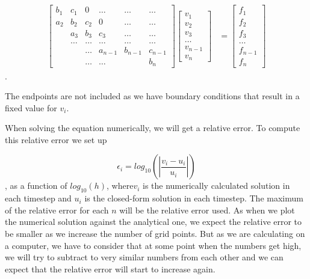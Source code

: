 \documentclass[a4paper,norsk,12pt,oneside]{article}
\begin{document}
\begin{align}\label{eq:general}
	\label{full eq Ax=f}	
	\begin{bmatrix}
		b_{1} & c_{1} & 0 & \hdots & \hdots & \hdots \\
		a_{2} & b_{2} & c_{2} & 0 & \hdots & \hdots \\
		& a_{3} & b_{3} & c_{3} & \hdots & \hdots \\
		& \hdots & \hdots & \hdots & \hdots & \hdots \\ 
		&& \hdots & a_{n-1} & b_{n-1} & c_{n-1} \\
		&& \hdots & \hdots &  & b_{n} 
	\end{bmatrix} \begin{bmatrix}
	v_1 \\ v_2 \\ v_3 \\ \hdots \\ v_{n-1} \\ v_n
	\end{bmatrix} &= \begin{bmatrix}
	f_1 \\ f_2 \\ f_3 \\ \hdots \\ f_{n-1} \\ f_n
	\end{bmatrix}
\end{align}. 

The endpoints are not included as we have boundary conditions that result in a fixed 
value for \(v_i\). 

When solving the equation numerically, we will get a relative error.
To compute this relative error we set up 

\begin{equation*}
    \epsilon_i = log_{10} \left ( \left | \frac{v_i - u_i}{u_i} \right | \right )
\end{equation*}, 
as a function of \(log_{10}(h)\), where\(v_i\) is the numerically calculated solution
in each timestep and \(u_i\) is the closed-form solution in each timestep. The maximum of
the relative error for each \(n\) will be the relative error used. 
As when we plot the numerical solution against the analytical one, we expect the relative 
error to be smaller as we increase the number of grid points. But as we are calculating 
on a computer, we have to consider that at some point when the numbers get high,
we will try to subtract to very similar numbers from each other and we can expect that the relative
error will start to increase again. 
\end{document}
